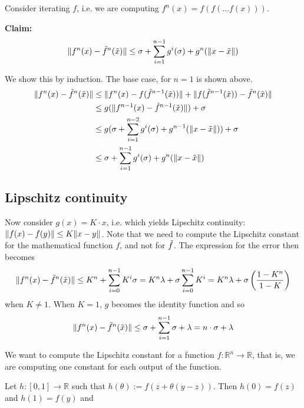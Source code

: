 Consider iterating $f$, i.e. we are computing $f^n(x) = f(f(...f(x)))$.

{\bf Claim: }
\begin{equation}
\lVert f^n(x) - \tilde{f}^n(\tilde{x})\rVert \le \sigma + \sum^{n - 1}_{i = 1} g^i(\sigma) + g^n(\lVert x - \tilde{x} \rVert)
\end{equation}

We show this by induction. The base case, for $n = 1$ is shown above.
\begin{align}
\lVert  f^n(x) - \tilde{f}^n(\tilde{x})\rVert &\le
  \lVert f^n(x) - f(\tilde{f}^{n-1}(\tilde{x})) \rVert + \lVert f(\tilde{f}^{n-1}(\tilde{x})) - \tilde{f}^n(\tilde{x})\rVert \\
  &\le g(\lVert f^{n-1}(x) - \tilde{f}^{n-1}(\tilde{x}) \rVert) + \sigma \\
  &\le g (\sigma + \sum^{n - 2}_{i = 1} g^i(\sigma) + g^{n-1}(\lVert x - \tilde{x} \rVert)) + \sigma \\
  &\le \sigma + \sum^{n - 1}_{i = 1} g^i(\sigma) + g^n(\lVert x - \tilde{x} \rVert)
\end{align}

\subsection{Lipschitz continuity}
Now consider $g(x) = K \cdot x$, i.e. which yields Lipschitz continuity:
$\lVert f(x) - f(y) \rVert \le K \lVert x - y \rVert$.
Note that we need to compute the Lipschitz constant for the mathematical function $f$,
and not for $\tilde{f}$.
The expression for the error then becomes
\begin{align}
\lVert f^n(x) - \tilde{f}^n(\tilde{x})\rVert \le K^n + \sum^{n-1}_{i=0}K^i \sigma
  = K^n \lambda + \sigma \sum^{n-1}_{i=0} K^i
  = K^n \lambda + \sigma \left(\dfrac{1 - K^n}{1-K} \right)
\end{align}
when $K \ne 1$.
When $K = 1$, $g$ becomes the identity function and so
\begin{align}
\lVert f^n(x) - \tilde{f}^n(\tilde{x})\rVert \le \sigma + \sum^{n-1}_{i=1}\sigma + \lambda
= n \cdot \sigma + \lambda
\end{align}

We want to compute the Lipschitz constant for a function $f: \mathbb{R}^n \to \mathbb{R}$,
that is, we are computing one constant for each output of the function.

Let $h: [0, 1] \to \mathbb{R}$ such that $h(\theta) := f(z + \theta(y-z))$.
Then $h(0) = f(z)$ and $h(1) = f(y)$ and

